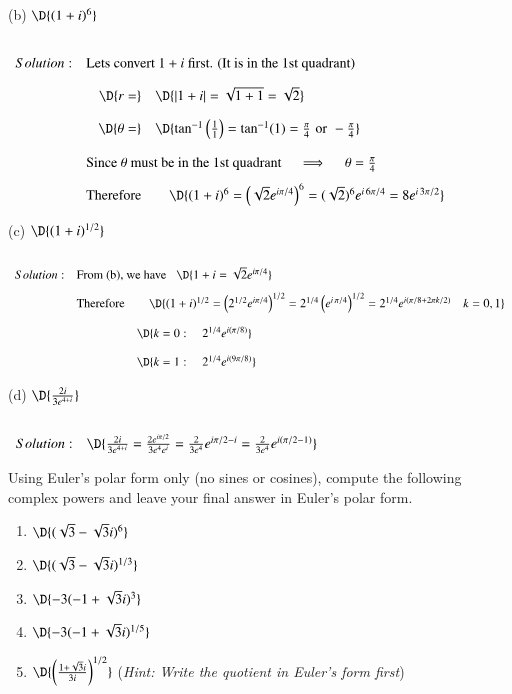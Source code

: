 \documentclass[11pt]{article}
\begin{document}
(b) $\D{(1+i)^6}$ 

$
\setlength{\extrarowheight}{0.4cm}
\begin{array}{rrl}
	Solution: & \multicolumn{2}{l}{\text{Lets convert $1+i$ first. (It is in the 1st quadrant)}} \\
	& \D{r =} & \D{\left|1+i\right| = \sqrt{1+1} = \sqrt{2} } \\
	& \D{\theta =} & \D{\tan^{-1}\left(\frac{1}{1}\right) = \tan^{-1}(1) = \frac{\pi}{4} \,\,\text{or}\,\, -\frac{\pi}{4} } \\
	& \multicolumn{2}{l}{\text{Since $\theta$ must be in the 1st quadrant $\quad \implies \quad \theta = \frac{\pi}{4}$ }} \\
	& \text{Therefore} & \quad \D{(1+i)^6 = \left(\sqrt{2}e^{i\pi/4}\right)^6 = (\sqrt{2})^6e^{i\,6\pi/4}= 8e^{i\,3\pi/2}} \\
\end{array}
$

(c) $\D{(1+i)^{1/2}}$ 

$
\setlength{\extrarowheight}{0.4cm}
\begin{array}{rrl}
	Solution: & \multicolumn{2}{l}{\text{From (b), we have \,\, }\D{ 1+i = \sqrt{2}e^{i\pi/4} }} \\
	& \text{Therefore} & \quad \D{(1+i)^{1/2} = \left(2^{1/2}e^{i\pi/4}\right)^{1/2} = 2^{1/4}\left(e^{i\,\pi/4}\right)^{1/2} = 2^{1/4} e^{i(\pi/8+2\pi k/2)} \quad k=0,1} \\
	&& \D{k=0: \quad 2^{1/4}e^{i(\pi/8)}} \\
	&& \D{k=1: \quad 2^{1/4}e^{i(9\pi/8)}} \\
\end{array}
$

(d) $\D{\frac{2i}{3e^{4+i}}}$ 

$
\setlength{\extrarowheight}{0.4cm}
\begin{array}{rrl}
	Solution: & \D{\frac{2i}{3e^{4+i}} = \frac{2e^{i\pi/2}}{3e^4e^{i}} = \frac{2}{3e^4}e^{i\pi/2-i} = \frac{2}{3e^4}e^{i(\pi/2-1)}} \\
\end{array}
$

\newpage
\thispagestyle{empty}


\vspace{0.2cm}

Using Euler's polar form only (no sines or cosines), compute the following complex powers and leave your final answer in Euler's polar form.
\begin{enumerate}
	\item $\D{(\sqrt{3}-\sqrt{3}i)^6}$
	\item $\D{(\sqrt{3}-\sqrt{3}i)^{1/3}}$
	\item $\D{-3(-1+\sqrt{3}i)^3}$
	\item $\D{-3(-1+\sqrt{3}i)^{1/5}}$
	\item $\D{\left(\frac{1+\sqrt{3}i}{3i}\right)^{1/2}}$ \quad ({\it Hint: Write the quotient in Euler's form first})  
\end{enumerate}
\end{document}
